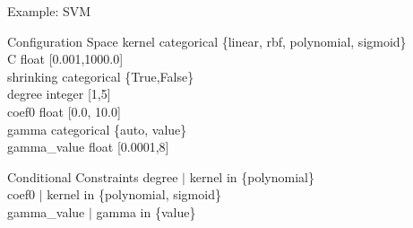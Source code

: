 {
\begin{frame}[c]{Example: SVM}

\begin{block}{Configuration Space}
kernel categorical \{linear, rbf, polynomial, sigmoid\}\\
C float [0.001,1000.0]\\
shrinking categorical \{True,False\}\\
degree integer [1,5]\\
coef0 float [0.0, 10.0]\\
gamma categorical \{auto, value\}\\
gamma\_value float [0.0001,8]\\
\end{block}

\begin{block}{Conditional Constraints}
degree $\mid$ kernel in \{polynomial\}\\
coef0 $\mid$ kernel in \{polynomial, sigmoid\}\\
gamma\_value $\mid$ gamma in \{value\}
\end{block}

\end{frame}
}
